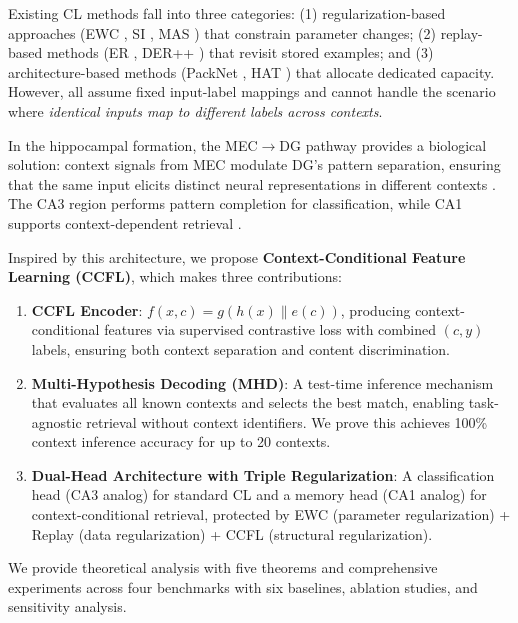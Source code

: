 \documentclass[letterpaper, 10pt, times]{article}
\begin{document}
Existing CL methods fall into three categories: (1) regularization-based approaches (EWC \cite{kirkpatrick2017overcoming}, SI \cite{zenke2017continual}, MAS \cite{aljundi2018memory}) that constrain parameter changes; (2) replay-based methods (ER \cite{chaudhry2019efficient}, DER++ \cite{boschini2022class}) that revisit stored examples; and (3) architecture-based methods (PackNet \cite{mallya2018packnet}, HAT \cite{serra2020overcoming}) that allocate dedicated capacity. However, all assume fixed input-label mappings and cannot handle the scenario where \emph{identical inputs map to different labels across contexts}.

In the hippocampal formation, the MEC$\to$DG pathway provides a biological solution: context signals from MEC modulate DG's pattern separation, ensuring that the same input elicits distinct neural representations in different contexts \cite{leutgeb2007pattern,mcnaughton2006path}. The CA3 region performs pattern completion for classification, while CA1 supports context-dependent retrieval \cite{knierim2006neural}.

Inspired by this architecture, we propose \textbf{Context-Conditional Feature Learning (CCFL)}, which makes three contributions:

\begin{enumerate}
\item \textbf{CCFL Encoder}: $f(x,c) = g(h(x) \| e(c))$, producing context-conditional features via supervised contrastive loss with combined $(c, y)$ labels, ensuring both context separation and content discrimination.

\item \textbf{Multi-Hypothesis Decoding (MHD)}: A test-time inference mechanism that evaluates all known contexts and selects the best match, enabling task-agnostic retrieval without context identifiers. We prove this achieves 100\% context inference accuracy for up to 20 contexts.

\item \textbf{Dual-Head Architecture with Triple Regularization}: A classification head (CA3 analog) for standard CL and a memory head (CA1 analog) for context-conditional retrieval, protected by EWC (parameter regularization) + Replay (data regularization) + CCFL (structural regularization).
\end{enumerate}

We provide theoretical analysis with five theorems and comprehensive experiments across four benchmarks with six baselines, ablation studies, and sensitivity analysis.
\end{document}
